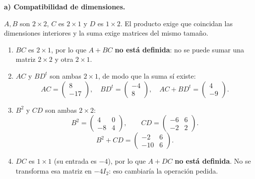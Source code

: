\textbf{a) Compatibilidad de dimensiones.}\par\nopagebreak[4]
$A,B$ son $2\times2$, $C$ es $2\times1$ y $D$ es $1\times2$. El producto exige que coincidan las dimensiones interiores y la suma exige matrices del mismo tamaño.
\begin{enumerate}[label=\arabic*)]
\item $BC$ es $2\times1$, por lo que $A+BC$ \textbf{no está definida}: no se puede sumar una matriz $2\times2$ y otra $2\times1$.
\item $AC$ y $BD^t$ son ambas $2\times1$, de modo que la suma sí existe:
\[
AC=\begin{pmatrix}8\\-17\end{pmatrix},\quad
BD^t=\begin{pmatrix}-4\\8\end{pmatrix},\quad
\boxed{AC+BD^t=\begin{pmatrix}4\\-9\end{pmatrix}.}
\]
\item $B^2$ y $CD$ son ambas $2\times2$:
\[
B^2=\begin{pmatrix}4&0\\-8&4\end{pmatrix},\qquad
CD=\begin{pmatrix}-6&6\\-2&2\end{pmatrix}.
\]
\[
\boxed{B^2+CD=\begin{pmatrix}-2&6\\-10&6\end{pmatrix}.}
\]
\item $DC$ es $1\times1$ (su entrada es $-4$), por lo que $A+DC$ \textbf{no está definida}. No se transforma esa matriz en $-4I_2$: eso cambiaría la operación pedida.
\end{enumerate}

